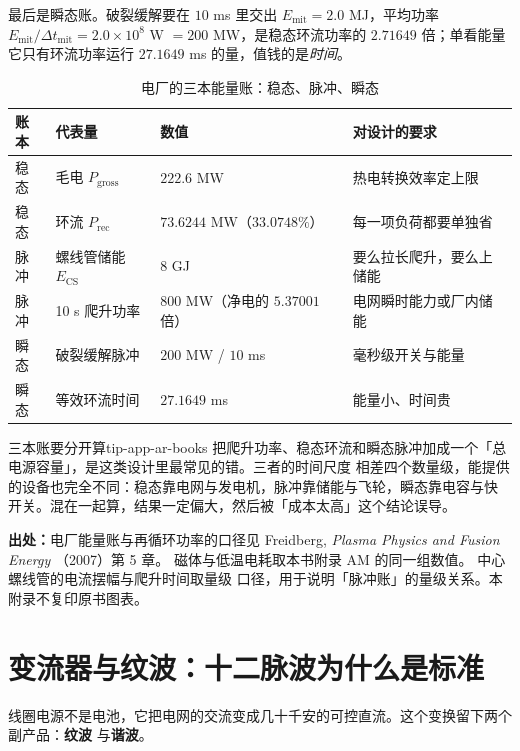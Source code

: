 最后是瞬态账。破裂缓解要在 $10$ ms 里交出 $E_\mathrm{mit}=2.0$ MJ，平均功率
$E_\mathrm{mit}/\Delta t_\mathrm{mit}=2.0\times10^{8}$ W $=200$ MW，是稳态环流功率的
$2.71649$ 倍；单看能量它只有环流功率运行 $27.1649$ ms 的量，值钱的是\emph{时间}。

\begin{table}[htbp]
\centering
\small
\caption{电厂的三本能量账：稳态、脉冲、瞬态}
\label{tab:app-ar-books}
\begin{tabular}{p{2.6cm}p{3.5cm}p{3.3cm}p{3.6cm}}
\hline
账本 & 代表量 & 数值 & 对设计的要求 \\
\hline
稳态 & 毛电 $P_\mathrm{gross}$ & $222.6$ MW & 热电转换效率定上限 \\
稳态 & 环流 $P_\mathrm{rec}$ & $73.6244$ MW（$33.0748\%$） & 每一项负荷都要单独省 \\
脉冲 & 螺线管储能 $E_\mathrm{CS}$ & $8$ GJ & 要么拉长爬升，要么上储能 \\
脉冲 & 10 s 爬升功率 & $800$ MW（净电的 $5.37001$ 倍） & 电网瞬时能力或厂内储能 \\
瞬态 & 破裂缓解脉冲 & $200$ MW / $10$ ms & 毫秒级开关与能量 \\
瞬态 & 等效环流时间 & $27.1649$ ms & 能量小、时间贵 \\
\hline
\end{tabular}
\end{table}

\begin{tip}{三本账要分开算}{tip-app-ar-books}
把爬升功率、稳态环流和瞬态脉冲加成一个「总电源容量」，是这类设计里最常见的错。三者的时间尺度
相差四个数量级，能提供的设备也完全不同：稳态靠电网与发电机，脉冲靠储能与飞轮，瞬态靠电容与快
开关。混在一起算，结果一定偏大，然后被「成本太高」这个结论误导。
\end{tip}

{\small

\textbf{出处：}电厂能量账与再循环功率的口径见 Freidberg, \emph{Plasma Physics and Fusion Energy}
（2007）第 5 章。
磁体与低温电耗取本书附录 AM 的同一组数值。
中心螺线管的电流摆幅与爬升时间取量级
口径，用于说明「脉冲账」的量级关系。本附录不复印原书图表。
}

\section{变流器与纹波：十二脉波为什么是标准}
\label{sec:app-ar-converter}

线圈电源不是电池，它把电网的交流变成几十千安的可控直流。这个变换留下两个副产品：\textbf{纹波}
与\textbf{谐波}。

